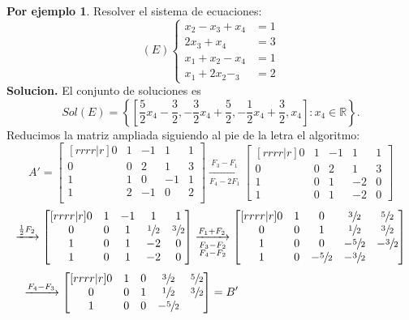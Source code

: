 \documentclass{article}
\theoremstyle{definition}
\theoremstyle{definition}
\newtheorem*{ej}{Por ejemplo}
\theoremstyle{remark}
\begin{document}
\begin{ej}
  Resolver el sistema de ecuaciones: \[
    (E)\left\{\begin{array}{ll}x_2 -x_3 + x_4 & =1 \\ 2x_3 + x_4 & = 3 \\ x_1 + x_2 - x_4 & = 1 \\ x_1 + 2x_2 - _3 & = 2\end{array} \right.
  \]
\textbf{Solucion.} El conjunto de soluciones es \[
Sol(E)=\left\{\left[\frac{5}{2}x_4-\frac{3}{2},-\frac{3}{2}x_4+\frac{5}{2},-\frac{1}{2}x_4+\frac{3}{2},x_4\right] : x_4 \in \mathbb{R}\right\}.
\]
Reducimos la matriz ampliada siguiendo al pie de la letra el algoritmo: \[
  A'=\begin{bmatrix}[rrrr|r]
    0 & 1 & -1 & 1 & 1 \\
    0 & 0 & 2 & 1 & 3 \\
    1 & 1 & 0 & -1 & 1 \\
    1 & 2 & -1 & 0 & 2 \\
  \end{bmatrix} \underset{F_4-2F_1}{\xrightarrow{F_3-F_1}} \begin{bmatrix}[rrrr|r] 
    0 & 1 & -1 & 1 & 1 \\
    0 & 0 & 2 & 1 & 3 \\
    1 & 0 & 1 & -2 & 0 \\
    1 & 0 & 1 & -2 & 0 
  \end{bmatrix}
\]
\[
  \xrightarrow{\frac{1}{2}F_2} \begin{bmatrix}[rrrr|r] 
    0 & 1 & -1 & 1 & 1 \\
    0 & 0 & 1 & \sfrac{1}{2} & \sfrac{3}{2} \\
    1 & 0 & 1 & -2 & 0 \\
    1 & 0 & 1 & -2 & 0 
  \end{bmatrix}
  \underset{\begin{subarray}{l} F_3-F_2 \\ F_4 - F_2 \end{subarray}}{\xrightarrow{F_1+F_2}} \begin{bmatrix}[rrrr | r] 0 & 1 & 0 & \sfrac{3}{2} & \sfrac{5}{2} \\ 
0 & 0 & 1 & \sfrac{1}{2} & \sfrac{3}{2} \\
1 & 0 & 0 & -\sfrac{5}{2} & -\sfrac{3}{2} \\
1 & 0 & -\sfrac{5}{2} & -\sfrac{3}{2} 
\end{bmatrix} 
\]
\[
  \xrightarrow{F_4-F_3} \begin{bmatrix}[rrrr|r] 0 & 1 & 0 & \sfrac{3}{2} & \sfrac{5}{2} \\
    0 & 0 & 1 & \sfrac{1}{2} & \sfrac{3}{2} \\
    1 & 0 & 0 & -\sfrac{5}{2} 
  \end{bmatrix} = B' \quad \quad \quad \quad \quad \quad \quad \quad \quad \quad   \quad \quad \quad \quad 
\]\pagebreak 


\end{ej}
\end{document}
